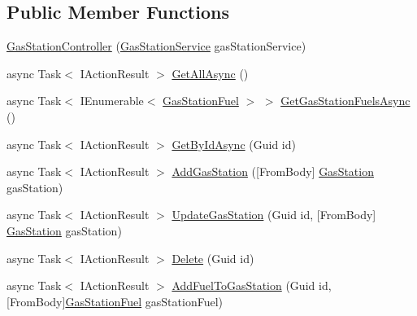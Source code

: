 \subsection*{Public Member Functions}
\begin{DoxyCompactItemize}
\item 
\mbox{\hyperlink{class_gasoline_1_1_api_1_1_controllers_1_1_gas_station_controller_a1995c0ed2466f4f802961b9cbada4ff9}{Gas\+Station\+Controller}} (\mbox{\hyperlink{class_gasoline_1_1_data_1_1_services_1_1_gas_station_service}{Gas\+Station\+Service}} gas\+Station\+Service)
\item 
async Task$<$ I\+Action\+Result $>$ \mbox{\hyperlink{class_gasoline_1_1_api_1_1_controllers_1_1_gas_station_controller_a5e9efb55ece5a16ebd62ee7614118f6a}{Get\+All\+Async}} ()
\item 
async Task$<$ I\+Enumerable$<$ \mbox{\hyperlink{class_gasoline_1_1_data_1_1_models_1_1_gas_station_fuel}{Gas\+Station\+Fuel}} $>$ $>$ \mbox{\hyperlink{class_gasoline_1_1_api_1_1_controllers_1_1_gas_station_controller_a6175921a431421bc125d784a74df8ec1}{Get\+Gas\+Station\+Fuels\+Async}} ()
\item 
async Task$<$ I\+Action\+Result $>$ \mbox{\hyperlink{class_gasoline_1_1_api_1_1_controllers_1_1_gas_station_controller_a4b57ad8b5062af978a36151f20707497}{Get\+By\+Id\+Async}} (Guid id)
\item 
async Task$<$ I\+Action\+Result $>$ \mbox{\hyperlink{class_gasoline_1_1_api_1_1_controllers_1_1_gas_station_controller_a2b5f0af4e6019b907a794d99f553653b}{Add\+Gas\+Station}} (\mbox{[}From\+Body\mbox{]} \mbox{\hyperlink{class_gasoline_1_1_data_1_1_models_1_1_gas_station}{Gas\+Station}} gas\+Station)
\item 
async Task$<$ I\+Action\+Result $>$ \mbox{\hyperlink{class_gasoline_1_1_api_1_1_controllers_1_1_gas_station_controller_a0cd180bdc7cab32b263a2da6688acc4c}{Update\+Gas\+Station}} (Guid id, \mbox{[}From\+Body\mbox{]} \mbox{\hyperlink{class_gasoline_1_1_data_1_1_models_1_1_gas_station}{Gas\+Station}} gas\+Station)
\item 
async Task$<$ I\+Action\+Result $>$ \mbox{\hyperlink{class_gasoline_1_1_api_1_1_controllers_1_1_gas_station_controller_a48a80d391879bb7af7633f533c01fc1e}{Delete}} (Guid id)
\item 
async Task$<$ I\+Action\+Result $>$ \mbox{\hyperlink{class_gasoline_1_1_api_1_1_controllers_1_1_gas_station_controller_a83af1e4ba007a75c65f4a63928e8cf97}{Add\+Fuel\+To\+Gas\+Station}} (Guid id, \mbox{[}From\+Body\mbox{]}\mbox{\hyperlink{class_gasoline_1_1_data_1_1_models_1_1_gas_station_fuel}{Gas\+Station\+Fuel}} gas\+Station\+Fuel)

\end{DoxyCompactItemize}
